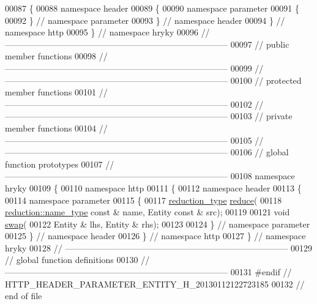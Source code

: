 \begin{DoxyCode}
00087 \{
00088 \textcolor{keyword}{namespace }header
00089 \{
00090 \textcolor{keyword}{namespace }parameter
00091 \{
00092 \} \textcolor{comment}{// namespace parameter}
00093 \} \textcolor{comment}{// namespace header}
00094 \} \textcolor{comment}{// namespace http}
00095 \} \textcolor{comment}{// namespace hryky}
00096 \textcolor{comment}{//
      ------------------------------------------------------------------------------}
00097 \textcolor{comment}{// public member functions}
00098 \textcolor{comment}{//
      ------------------------------------------------------------------------------}
00099 \textcolor{comment}{//
      ------------------------------------------------------------------------------}
00100 \textcolor{comment}{// protected member functions}
00101 \textcolor{comment}{//
      ------------------------------------------------------------------------------}
00102 \textcolor{comment}{//
      ------------------------------------------------------------------------------}
00103 \textcolor{comment}{// private member functions}
00104 \textcolor{comment}{//
      ------------------------------------------------------------------------------}
00105 \textcolor{comment}{//
      ------------------------------------------------------------------------------}
00106 \textcolor{comment}{// global function prototypes}
00107 \textcolor{comment}{//
      ------------------------------------------------------------------------------}
00108 \textcolor{keyword}{namespace }hryky
00109 \{
00110 \textcolor{keyword}{namespace }http
00111 \{
00112 \textcolor{keyword}{namespace }header
00113 \{
00114 \textcolor{keyword}{namespace }parameter
00115 \{
00117     \hyperlink{namespacehryky_a343a9a4c36a586be5c2693156200eadc}{reduction_type} \hyperlink{namespacehryky_1_1http_a08fc36a78a8e2908140fcd102829a566}{reduce}(
00118         \hyperlink{namespacehryky_1_1reduction_ac686c30a4c8d196bbd0f05629a6b921f}{reduction::name_type} \textcolor{keyword}{const} & name, Entity \textcolor{keyword}{const} & src);
00119 
00121     \textcolor{keywordtype}{void} \hyperlink{namespacehryky_1_1http_a38e62595ad532d18fbc65ceb61973aec}{swap}(
00122         Entity & lhs, Entity & rhs);
00123 
00124 \} \textcolor{comment}{// namespace parameter}
00125 \} \textcolor{comment}{// namespace header}
00126 \} \textcolor{comment}{// namespace http}
00127 \} \textcolor{comment}{// namespace hryky}
00128 \textcolor{comment}{//
      ------------------------------------------------------------------------------}
00129 \textcolor{comment}{// global function definitions}
00130 \textcolor{comment}{//
      ------------------------------------------------------------------------------}
00131 \textcolor{preprocessor}{#endif // HTTP\_HEADER\_PARAMETER\_ENTITY\_H\_20130112122723185}
00132 \textcolor{preprocessor}{}\textcolor{comment}{// end of file}
\end{DoxyCode}
